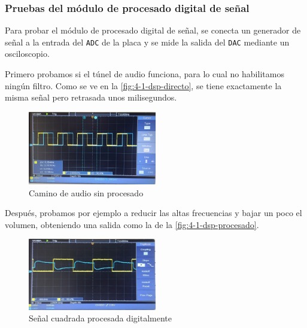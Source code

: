 \subsubsection{Pruebas del módulo de procesado digital de señal}

Para probar el módulo de procesado digital de señal, se conecta un generador de señal a la entrada del \texttt{ADC} de la placa y se mide la salida del \texttt{DAC} mediante un osciloscopio.

Primero probamos si el túnel de audio funciona, para lo cual no habilitamos ningún filtro. Como se ve en la \autoref{fig:4-1-dsp-directo}, se tiene exactamente la misma señal pero retrasada unos milisegundos.

\begin{figure}[h]
    \centering
    \includegraphics[width=0.5\textwidth]{images/4/4-1/audio-directo.png}
    \caption{Camino de audio sin procesado}
    \label{fig:4-1-dsp-directo}
\end{figure}

Después, probamos por ejemplo a reducir las altas frecuencias y bajar un poco el volumen, obteniendo una salida como la de la \autoref{fig:4-1-dsp-procesado}.

\begin{figure}[h]
    \centering
    \includegraphics[width=0.5\textwidth]{images/4/4-1/audio-procesado.png}
    \caption{Señal cuadrada procesada digitalmente}
    \label{fig:4-1-dsp-procesado}
\end{figure}